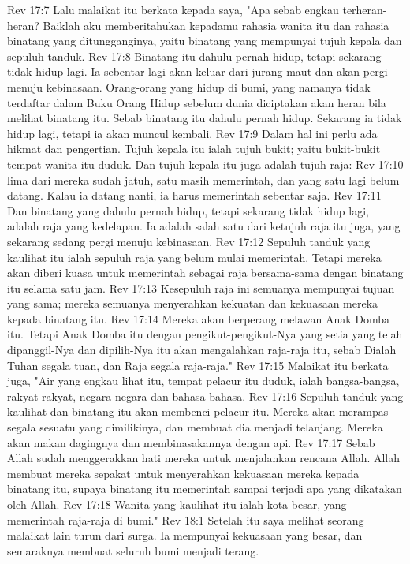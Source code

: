 Rev 17:7  Lalu malaikat itu berkata kepada saya, "Apa sebab engkau terheran-heran? Baiklah aku memberitahukan kepadamu rahasia wanita itu dan rahasia binatang yang ditungganginya, yaitu binatang yang mempunyai tujuh kepala dan sepuluh tanduk.
Rev 17:8  Binatang itu dahulu pernah hidup, tetapi sekarang tidak hidup lagi. Ia sebentar lagi akan keluar dari jurang maut dan akan pergi menuju kebinasaan. Orang-orang yang hidup di bumi, yang namanya tidak terdaftar dalam Buku Orang Hidup sebelum dunia diciptakan akan heran bila melihat binatang itu. Sebab binatang itu dahulu pernah hidup. Sekarang ia tidak hidup lagi, tetapi ia akan muncul kembali.
Rev 17:9  Dalam hal ini perlu ada hikmat dan pengertian. Tujuh kepala itu ialah tujuh bukit; yaitu bukit-bukit tempat wanita itu duduk. Dan tujuh kepala itu juga adalah tujuh raja:
Rev 17:10  lima dari mereka sudah jatuh, satu masih memerintah, dan yang satu lagi belum datang. Kalau ia datang nanti, ia harus memerintah sebentar saja.
Rev 17:11  Dan binatang yang dahulu pernah hidup, tetapi sekarang tidak hidup lagi, adalah raja yang kedelapan. Ia adalah salah satu dari ketujuh raja itu juga, yang sekarang sedang pergi menuju kebinasaan.
Rev 17:12  Sepuluh tanduk yang kaulihat itu ialah sepuluh raja yang belum mulai memerintah. Tetapi mereka akan diberi kuasa untuk memerintah sebagai raja bersama-sama dengan binatang itu selama satu jam.
Rev 17:13  Kesepuluh raja ini semuanya mempunyai tujuan yang sama; mereka semuanya menyerahkan kekuatan dan kekuasaan mereka kepada binatang itu.
Rev 17:14  Mereka akan berperang melawan Anak Domba itu. Tetapi Anak Domba itu dengan pengikut-pengikut-Nya yang setia yang telah dipanggil-Nya dan dipilih-Nya itu akan mengalahkan raja-raja itu, sebab Dialah Tuhan segala tuan, dan Raja segala raja-raja."
Rev 17:15  Malaikat itu berkata juga, "Air yang engkau lihat itu, tempat pelacur itu duduk, ialah bangsa-bangsa, rakyat-rakyat, negara-negara dan bahasa-bahasa.
Rev 17:16  Sepuluh tanduk yang kaulihat dan binatang itu akan membenci pelacur itu. Mereka akan merampas segala sesuatu yang dimilikinya, dan membuat dia menjadi telanjang. Mereka akan makan dagingnya dan membinasakannya dengan api.
Rev 17:17  Sebab Allah sudah menggerakkan hati mereka untuk menjalankan rencana Allah. Allah membuat mereka sepakat untuk menyerahkan kekuasaan mereka kepada binatang itu, supaya binatang itu memerintah sampai terjadi apa yang dikatakan oleh Allah.
Rev 17:18  Wanita yang kaulihat itu ialah kota besar, yang memerintah raja-raja di bumi."
Rev 18:1  Setelah itu saya melihat seorang malaikat lain turun dari surga. Ia mempunyai kekuasaan yang besar, dan semaraknya membuat seluruh bumi menjadi terang.

